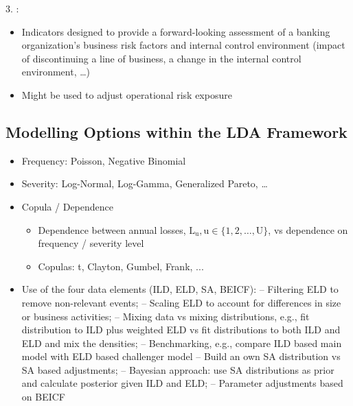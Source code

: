 3. :
\begin{itemize}[leftmargin=*]
    \item Indicators designed to provide a forward-looking
assessment of a banking organization's business risk
factors and internal control environment (impact of
discontinuing a line of business, a change in the
internal control environment, …)
    \item Might be used to adjust operational risk exposure
\end{itemize}






\subsection*{Modelling Options within the LDA Framework}
\begin{itemize}[leftmargin=*]
    \item Frequency: Poisson, Negative Binomial
    \item Severity: Log-Normal, Log-Gamma, Generalized Pareto, …
    \item Copula / Dependence
    \begin{itemize}[leftmargin=*]
        \item Dependence between annual losses, $\mathrm{L}_{\mathrm{u}}, \mathrm{u} \in\{1,2, \ldots, \mathrm{U}\}$, vs dependence on frequency / severity level
        \item Copulas: t, Clayton, Gumbel, Frank, ...
    \end{itemize}
    \item Use of the four data elements (ILD, ELD, SA, BEICF): 
    – Filtering ELD to remove non-relevant events; 
– Scaling ELD to account for differences in size or business activities; 
– Mixing data vs mixing distributions, e.g., fit distribution to ILD plus weighted ELD vs fit distributions to both ILD and ELD and mix the densities; 
– Benchmarking, e.g., compare ILD based main model with ELD based challenger model
– Build an own SA distribution vs SA based adjustments; 
– Bayesian approach: use SA distributions as prior and calculate posterior given ILD and ELD; 
– Parameter adjustments based on BEICF
\end{itemize}




